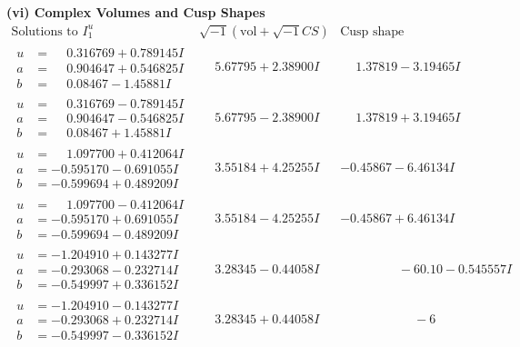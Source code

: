 \documentclass[1p]{elsarticle_modified}
\theoremstyle{definition}
\newcommand{\I}{\sqrt{-1}}
\begin{document}
\newpage\flushleft \textbf{(vi) Complex Volumes and Cusp Shapes}
$$\begin{array}{c|c|c}  
\text{Solutions to }I^u_{1}& \I (\text{vol} + \sqrt{-1}CS) & \text{Cusp shape}\\
 \hline 
\begin{aligned}
u &= \phantom{-}0.316769 + 0.789145 I \\
a &= \phantom{-}0.904647 + 0.546825 I \\
b &= \phantom{-}0.08467 - 1.45881 I\end{aligned}
 & \phantom{-}5.67795 + 2.38900 I & \phantom{-}1.37819 - 3.19465 I \\ \hline\begin{aligned}
u &= \phantom{-}0.316769 - 0.789145 I \\
a &= \phantom{-}0.904647 - 0.546825 I \\
b &= \phantom{-}0.08467 + 1.45881 I\end{aligned}
 & \phantom{-}5.67795 - 2.38900 I & \phantom{-}1.37819 + 3.19465 I \\ \hline\begin{aligned}
u &= \phantom{-}1.097700 + 0.412064 I \\
a &= -0.595170 - 0.691055 I \\
b &= -0.599694 + 0.489209 I\end{aligned}
 & \phantom{-}3.55184 + 4.25255 I & -0.45867 - 6.46134 I \\ \hline\begin{aligned}
u &= \phantom{-}1.097700 - 0.412064 I \\
a &= -0.595170 + 0.691055 I \\
b &= -0.599694 - 0.489209 I\end{aligned}
 & \phantom{-}3.55184 - 4.25255 I & -0.45867 + 6.46134 I \\ \hline\begin{aligned}
u &= -1.204910 + 0.143277 I \\
a &= -0.293068 - 0.232714 I \\
b &= -0.549997 + 0.336152 I\end{aligned}
 & \phantom{-}3.28345 - 0.44058 I & \phantom{-0.000000 }      -6
0. 10   - 0.545557 I \\ \hline\begin{aligned}
u &= -1.204910 - 0.143277 I \\
a &= -0.293068 + 0.232714 I \\
b &= -0.549997 - 0.336152 I\end{aligned}
 & \phantom{-}3.28345 + 0.44058 I & \phantom{-0.000000 -}     -6

\end{array}$$
\end{document}
